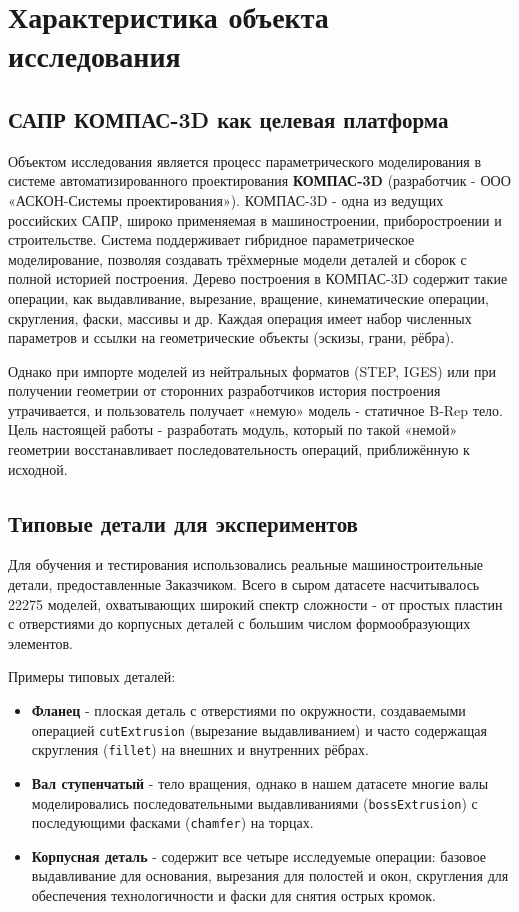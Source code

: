 
\section{Характеристика объекта исследования}

\subsection{САПР КОМПАС-3D как целевая платформа}
Объектом исследования является процесс параметрического моделирования в системе автоматизированного проектирования \textbf{КОМПАС-3D} (разработчик - ООО «АСКОН-Системы проектирования»). КОМПАС-3D - одна из ведущих российских САПР, широко применяемая в машиностроении, приборостроении и строительстве. Система поддерживает гибридное параметрическое моделирование, позволяя создавать трёхмерные модели деталей и сборок с полной историей построения. Дерево построения в КОМПАС-3D содержит такие операции, как выдавливание, вырезание, вращение, кинематические операции, скругления, фаски, массивы и др. Каждая операция имеет набор численных параметров и ссылки на геометрические объекты (эскизы, грани, рёбра).

Однако при импорте моделей из нейтральных форматов (STEP, IGES) или при получении геометрии от сторонних разработчиков история построения утрачивается, и пользователь получает «немую» модель - статичное B-Rep тело. Цель настоящей работы - разработать модуль, который по такой «немой» геометрии восстанавливает последовательность операций, приближённую к исходной.

\subsection{Типовые детали для экспериментов}
Для обучения и тестирования использовались реальные машиностроительные детали, предоставленные Заказчиком. Всего в сыром датасете насчитывалось 22275 моделей, охватывающих широкий спектр сложности - от простых пластин с отверстиями до корпусных деталей с большим числом формообразующих элементов. 

Примеры типовых деталей:
\begin{itemize}
    \item \textbf{Фланец} - плоская деталь с отверстиями по окружности, создаваемыми операцией \texttt{cutExtrusion} (вырезание выдавливанием) и часто содержащая скругления (\texttt{fillet}) на внешних и внутренних рёбрах.
    \item \textbf{Вал ступенчатый} - тело вращения, однако в нашем датасете многие валы моделировались последовательными выдавливаниями (\texttt{bossExtrusion}) с последующими фасками (\texttt{chamfer}) на торцах.
    \item \textbf{Корпусная деталь} - содержит все четыре исследуемые операции: базовое выдавливание для основания, вырезания для полостей и окон, скругления для обеспечения технологичности и фаски для снятия острых кромок.
\end{itemize}

